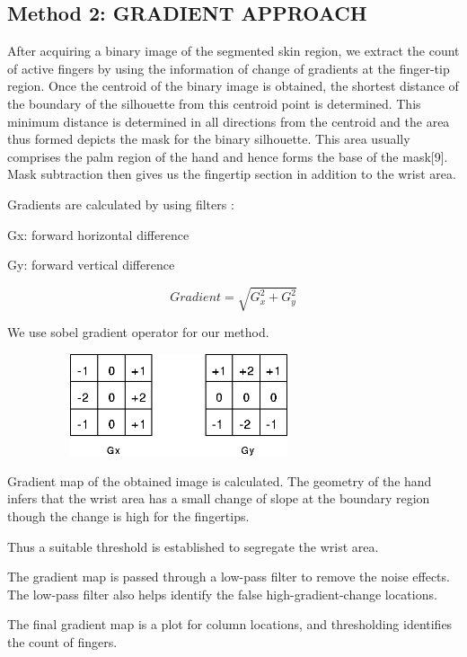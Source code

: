 \documentclass[conference]{IEEEtran}
\begin{document}
\subsection{Method 2: GRADIENT APPROACH}
After acquiring a binary image of the segmented skin region, we extract the count of active fingers by using the information of change of gradients at the finger-tip region.
Once the centroid of the binary image is obtained, the shortest distance of the boundary of the silhouette from this centroid point is determined. This minimum distance is determined in all directions from the centroid and the area thus formed depicts the mask for the binary silhouette. This area usually comprises the palm region of the hand and hence forms the base of the mask[9]. Mask subtraction then gives us the fingertip section in addition to the wrist area.

Gradients are calculated by using filters :

Gx: forward horizontal difference 

Gy: forward vertical difference

\[
     Gradient = \sqrt{G_x^2 + G_y^2} 
\]

We use sobel gradient operator for our method.
\begin{figure}[h!]
	\centering
	\includegraphics[width = 8cm, height = 3cm]{method2_1}
\end{figure}

Gradient map of the obtained image is calculated. The geometry of the hand infers that the wrist area has a small change of slope at the boundary region though the change is high for the fingertips.

Thus a suitable threshold is established to segregate the wrist area.

The gradient map is passed through a low-pass filter to remove the noise effects. The low-pass filter also helps identify the false high-gradient-change locations.

The final gradient map is a plot for column locations, and thresholding identifies the count of fingers.
\end{document}
